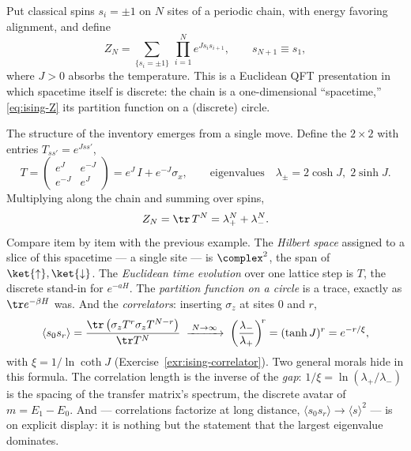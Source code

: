 \begin{eexample}
\label{ex:ising-chain}
Put classical spins $s_i = \pm 1$ on $N$ sites of a periodic chain, with energy
favoring alignment, and define
\begin{equation}
Z_N = \sum_{\{s_i = \pm 1\}} \, \prod_{i=1}^{N} e^{J s_i s_{i+1}} ,
  \qquad s_{N+1} \equiv s_1 ,
\label{eq:ising-Z}
\end{equation}
where $J > 0$ absorbs the temperature. This is a Euclidean QFT presentation in
which spacetime itself is discrete: the chain is a one-dimensional
``spacetime,'' \eqref{eq:ising-Z} its partition function on a (discrete) circle.

The structure of the inventory emerges from a single move. Define the $2\times
2$  with entries $T_{s s'} = e^{J s s'}$,
\begin{equation}
T = \begin{pmatrix} e^{J} & e^{-J} \\ e^{-J} & e^{J} \end{pmatrix}
= e^{J}\,I + e^{-J} \sigma_x ,
\qquad \text{eigenvalues} \quad \lambda_\pm = 2\cosh J,\; 2 \sinh J .
\end{equation}
Multiplying along the chain and summing over spins,
\begin{equation}
Z_N = \tr \, T^N = \lambda_+^N + \lambda_-^N .
\label{eq:ising-trace}
\end{equation}
Compare item by item with the previous example. The \emph{Hilbert space}
assigned to a slice of this spacetime --- a single site --- is $\complex^2$, the
span of $\ket{\uparrow}, \ket{\downarrow}$. The \emph{Euclidean time evolution}
over one lattice step is $T$, the discrete stand-in for $e^{-aH}$. The
\emph{partition function on a circle} is a trace, exactly as $\tr e^{-\beta H}$
was. And the \emph{correlators}: inserting $\sigma_z$ at sites $0$ and $r$,
\begin{equation}
\langle s_0 s_r \rangle = \frac{\tr \left( \sigma_z T^{r} \sigma_z T^{N-r}
\right)}{\tr T^N}
\;\xrightarrow{\;N \to \infty\;}\;
\left(\frac{\lambda_-}{\lambda_+}\right)^{\!r} = (\tanh J)^r = e^{-r/\xi},
\label{eq:ising-correlator}
\end{equation}
with  $\xi = 1/\ln \coth J$
(Exercise~\ref{exr:ising-correlator}). Two general morals hide in this formula.
The correlation length is the inverse of the \emph{gap}: $1/\xi =
\ln(\lambda_+/\lambda_-)$ is the spacing of the transfer matrix's spectrum, the
discrete avatar of $m = E_1 - E_0$. And  ---
correlations factorize at long distance, $\langle s_0 s_r \rangle \to \langle s
\rangle^2$ --- is on explicit display: it is nothing but the statement that the
largest eigenvalue dominates.


\end{eexample}
